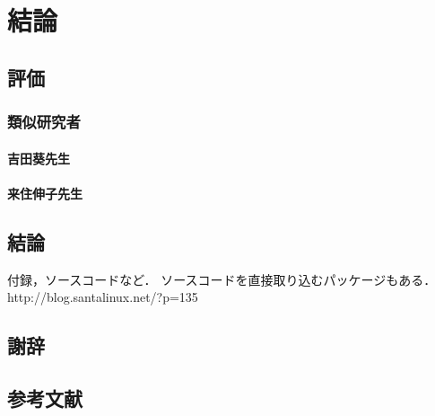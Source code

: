 \documentclass[a4paper,10pt,onecolumn,oneside,openany]{jsbook}
\begin{document}

\part{結論}
\chapter{評価}
\section{類似研究者}
\subsection{吉田葵先生}
\subsection{来住伸子先生}

\chapter{結論}


\appendix
付録，ソースコードなど．
ソースコードを直接取り込むパッケージもある．
http://blog.santalinux.net/?p=135

%
\chapter{謝辞}
%
%
%
\chapter{参考文献}
%
\end{document}
